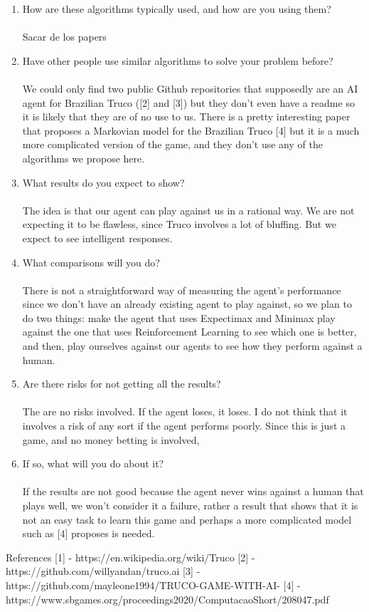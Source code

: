 \documentclass{article}
\begin{document}
\begin{enumerate}
\item How are these algorithms typically used, and how are you using them?
\\\\
Sacar de los papers

\item Have other people use similar algorithms to solve your problem before?
\\\\
We could only find two public Github repositories that supposedly are an AI agent for Brazilian Truco ([2] and [3]) but they don’t even have a readme so it is likely that they are of no use to us. There is a pretty interesting paper that proposes a Markovian model for the Brazilian Truco [4] but it is a much more complicated version of the game, and they don’t use any of the algorithms we propose here.

\item What results do you expect to show?
\\\\
The idea is that our agent can play against us in a rational way. We are not expecting it to be flawless, since Truco involves a lot of bluffing. But we expect to see intelligent responses.                                                                                                                        

\item What comparisons will you do?
\\\\
There is not a straightforward way of measuring the agent’s performance since we don’t have an already existing agent to play against, so we plan to do two things: make the agent that uses Expectimax and Minimax play against the one that uses Reinforcement Learning to see which one is better, and then, play ourselves against our agents to see how they perform against a human.
\item Are there risks for not getting all the results?
\\\\ 
The are no risks involved. If the agent loses, it loses. I do not think that it involves a risk of any sort if the agent performs poorly. Since this is just a game, and no money betting is involved,             
\item If so, what will you do about it?
\\\\	
If the results are not good because the agent never wins against a human that plays well, we won’t consider it a failure, rather a result that shows that it is not an easy task to learn this game and perhaps a more complicated model such as [4] proposes is needed.

\end{enumerate}


References
[1] -  https://en.wikipedia.org/wiki/Truco
[2] - https://github.com/willyandan/truco.ai
[3] - https://github.com/mayleone1994/TRUCO-GAME-WITH-AI-
[4] - https://www.sbgames.org/proceedings2020/ComputacaoShort/208047.pdf        
\end{document}
